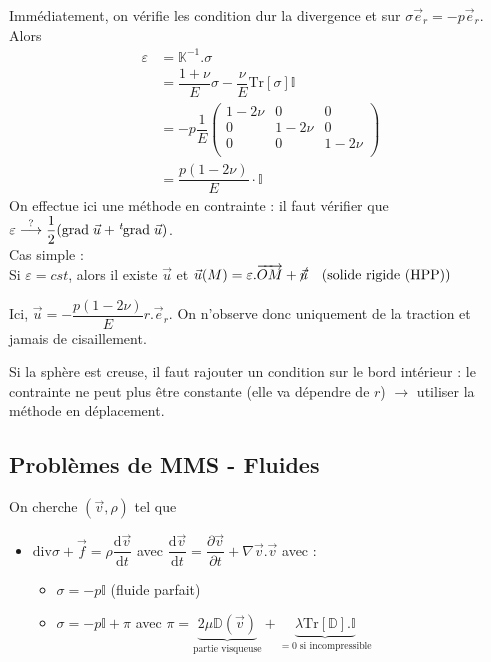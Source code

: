 \documentclass{article}
\newcommand{\deriv}{\mathrm{d}}
\newcommand{\grad}{\mathrm{grad}\;}
\newcommand{\transpose}{\hspace{.1em}{}^t\hspace{-.1em}}
\begin{document}
\begin{enumerate}
Immédiatement, on vérifie les condition dur la divergence et sur $\sigma \vec{e}_r = -p \vec{e}_r$.
Alors 
\begin{align*}
\varepsilon & = \mathbb{K}^{-1}.\sigma\\
& = \dfrac{1+\nu}{E}\sigma - \dfrac{\nu}{E}\text{Tr}[\sigma]\mathbb{I}\\
& = -p\dfrac{1}{E}
\begin{pmatrix}
1 - 2\nu & 0 & 0\\
0 & 1-2\nu & 0\\
0 & 0 & 1-2\nu\\
\end{pmatrix}\\
& = \dfrac{p(1-2\nu)}{E}\cdot\mathbb{I}
\end{align*}
On effectue ici une méthode en contrainte : il faut vérifier que $\varepsilon \overset{?}{\longrightarrow} \dfrac{1}{2} (\grad\vec{u} + \transpose\grad\vec{u})$.\\
Cas simple :\\
Si $\varepsilon = cst$, alors il existe $\vec{u}$ et $\vec{u}(M) = \varepsilon.\overrightarrow{OM} + \cancel{\vec{u}} \quad \text{(solide rigide (HPP))}$

Ici, $\vec{u}=-\dfrac{p(1-2\nu)}{E}r.\vec{e}_r$. On n'observe donc uniquement de la traction et jamais de cisaillement.
\bigskip

Si la sphère est creuse, il faut rajouter un condition sur le bord intérieur : le contrainte ne peut plus être constante (elle va dépendre de $r$) $\to$ utiliser la méthode en déplacement.
\end{enumerate}

\subsection{Problèmes de MMS - Fluides}

On cherche $(\vec{v}, \rho)$ tel que
\begin{itemize}
\item $\text{div} \sigma + \vec{f} = \rho \dfrac{\deriv \vec{v}}{\deriv t}$ avec $\dfrac{\deriv \vec{v}}{\deriv t} = \dfrac{\partial \vec{v}}{\partial t} + \nabla \vec{v}.\vec{v}$
avec :
\begin{itemize}[label=$\star$]
\item $\sigma = -p\mathbb{I}$ (fluide parfait)
\item $\sigma = -p\mathbb{I} + \pi$ avec $\pi = \underbrace{2\mu \mathbb{D}(\vec{v})}_{\text{partie visqueuse}} + \underbrace{\lambda \text{Tr}[\mathbb{D}].\mathbb{I}}_{=0 \; \text{si incompressible}}$
\end{itemize}
\end{itemize}
\end{document}

